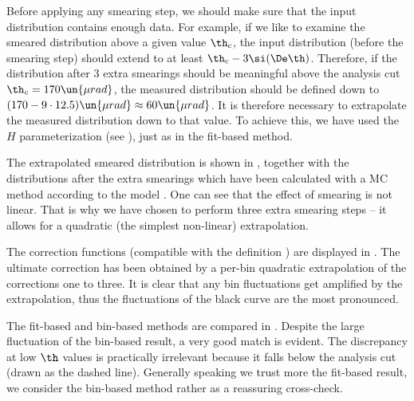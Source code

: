 Before applying any smearing step, we should make sure that the input distribution contains enough data. For example, if we like to examine the smeared distribution above a given value $\th_{\rm c}$, the input distribution (before the smearing step) should extend to at least $\th_{\rm c} -3\si(\De\th)$. Therefore, if the distribution after 3 extra smearings should be meaningful above the analysis cut $\th_c = 170\un{\mu rad}$, the measured distribution should be defined down to $(170 - 9\cdot 12.5) \un{\mu rad}\approx 60 \un{\mu rad}$. It is therefore necessary to extrapolate the measured distribution down to that value. To achieve this, we have used the $H$ parameterization (see ), just as in the fit-based method.

The extrapolated smeared distribution is shown in , together with the distributions after the extra smearings which have been calculated with a MC method according to the model . One can see that the effect of smearing is not linear. That is why we have chosen to perform three extra smearing steps -- it allows for a quadratic (the simplest non-linear) extrapolation.

The correction functions (compatible with the definition ) are displayed in . The ultimate correction has been obtained by a per-bin quadratic extrapolation of the corrections one to three. It is clear that any bin fluctuations get amplified by the extrapolation, thus the fluctuations of the black curve are the most pronounced.

\bmfig
{}
\emfig


The fit-based and bin-based methods are compared in . Despite the large fluctuation of the bin-based result, a very good match is evident. The discrepancy at low $\th$ values is practically irrelevant because it falls below the analysis cut (drawn as the dashed line). Generally speaking we trust more the fit-based result, we consider the bin-based method rather as a reassuring cross-check.

